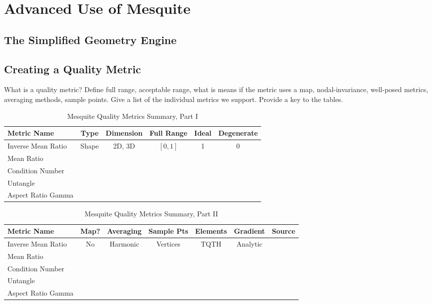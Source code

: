 \section{Advanced Use of Mesquite}

\subsection{The Simplified Geometry Engine}

\subsection{Creating a Quality Metric}
What is a quality metric? Define full range, acceptable range, what is means 
if the metric uses a map, nodal-invariance, well-posed metrics, averaging 
methods, sample points. Give a list of the individual metrics we support. 
Provide a key to the tables.

\begin{table}[h]
\begin{center}
\begin{tabular}{|l|c|c|c|c|c|}
\hline
Metric Name & Type & Dimension & Full Range & Ideal & Degenerate \\ \hline
Inverse Mean Ratio & Shape & 2D, 3D & $[0,1]$ & 1 & 0 \\ 
Mean Ratio &  &  &  &  &  \\ 
Condition Number &  &  &  &  &  \\ 
Untangle &  &  &  &  &  \\ 
Aspect Ratio Gamma &  &  &  &  &  \\ 
\hline
\end{tabular}
\caption{\label{QualityMetrics1} Mesquite Quality Metrics Summary, Part I}
\end{center}
\end{table}

\begin{table}[h]
\begin{center}
\begin{tabular}{|l|c|c|c|c|c|c|}
\hline
Metric Name & Map? & Averaging & Sample Pts & Elements & Gradient & Source \\ \hline
Inverse Mean Ratio & No & Harmonic & Vertices & TQTH & Analytic & \\ 
Mean Ratio &  &  &  &  &  \\ 
Condition Number &  &  &  &  &  \\ 
Untangle &  &  &  &  &  \\ 
Aspect Ratio Gamma &  &  &  &  &  \\ 
\hline
\end{tabular}
\caption{\label{QualityMetrics2} Mesquite Quality Metrics Summary, Part II}
\end{center}
\end{table}

